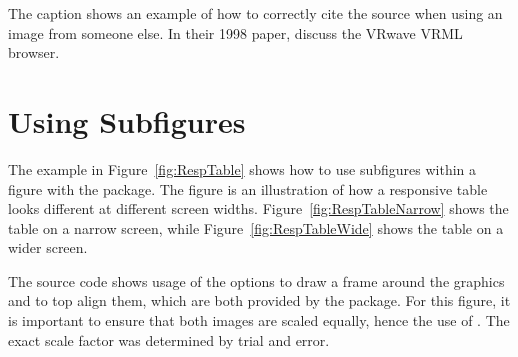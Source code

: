 The caption shows an example of how to correctly cite the source when
using an image from someone else. In their 1998 paper,
\textcite{Andrews-VRwave} discuss the VRwave VRML browser.




\section{Using Subfigures}

The example in Figure~\ref{fig:RespTable} shows how to use subfigures
within a figure with the  package. The figure is an
illustration of how a responsive table looks different at different
screen widths. Figure~\ref{fig:RespTableNarrow} shows the table on a
narrow screen, while Figure~\ref{fig:RespTableWide} shows the table on
a wider screen.

The source code shows usage of the  options
 to draw a frame around the graphics and 
to top align them, which are both provided by the 
package.  For this figure, it is important to ensure that both images
are scaled equally, hence the use of . The exact scale
factor was determined by trial and error.


